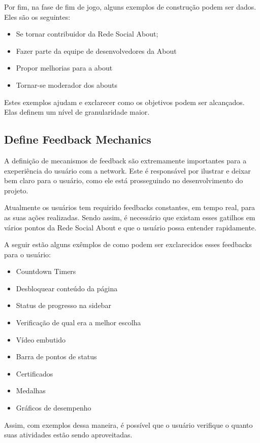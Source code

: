 Por fim, na fase de fim de jogo, alguns exemplos de construção podem ser dados. Eles são os seguintes:
\begin{itemize}
    \item Se tornar contribuidor da Rede Social About;
    \item Fazer parte da equipe de desenvolvedores da About
    \item Propor melhorias para a about
    \item Tornar-se moderador dos abouts
\end{itemize}

Estes exemplos ajudam e exclarecer como os objetivos podem ser alcançados. Elas definem um nível de
granularidade maior.

\subsection{Define Feedback Mechanics}
\label{sub:define_feedback_mechanics}
A definição de mecanismos de feedback são extremamente importantes para a exeperiência do usuário
com a network. Este é responsável por ilustrar e deixar bem claro para o usuário, como ele está
prosseguindo no desenvolvimento do projeto.

Atualmente os usuários tem requirido feedbacks constantes, em tempo real, para as suas ações
realizadas. Sendo assim, é necessário que existam esses gatilhos em vários pontos da
Rede Social About e que o usuário possa entender rapidamente.

A seguir estão alguns exêmplos de como podem ser exclarecidos esses feedbacks para o usuário:

\begin{itemize}
    \item Countdown Timers
    \item Desbloquear conteúdo da página
    \item Status de progresso na sidebar
    \item Verificação de qual era a melhor escolha
    \item Vídeo embutido
    \item Barra de pontos de status
    \item Certificados
    \item Medalhas
    \item Gráficos de desempenho
\end{itemize}

Assim, com exemplos dessa maneira, é possível que o usuário verifique o quanto suas atividades estão
sendo aproveitadas.


